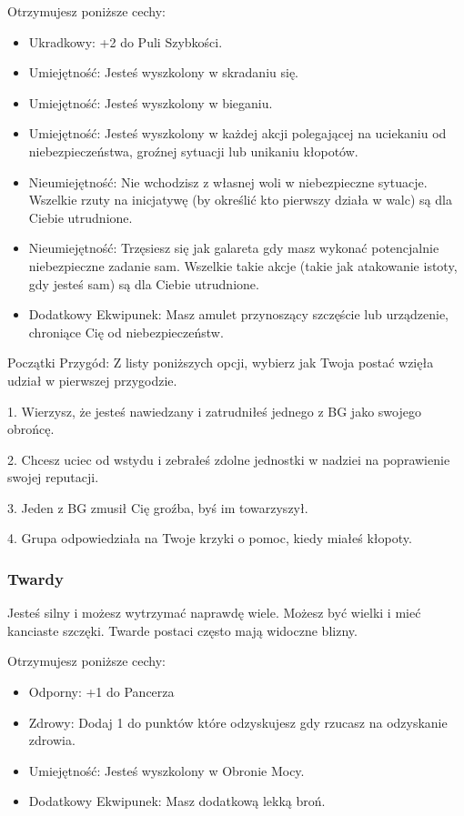 Otrzymujesz poniższe cechy:
\begin{itemize}
    \item  Ukradkowy: +2 do Puli Szybkości.
    \item  Umiejętność: Jesteś wyszkolony w skradaniu się.
    \item  Umiejętność: Jesteś wyszkolony w bieganiu.
    \item  Umiejętność: Jesteś wyszkolony w każdej akcji polegającej na uciekaniu od niebezpieczeństwa, groźnej sytuacji lub unikaniu kłopotów. 
    \item  Nieumiejętność: Nie wchodzisz z własnej woli w niebezpieczne sytuacje. Wszelkie rzuty na inicjatywę (by określić kto pierwszy działa w walc) są dla Ciebie utrudnione.
    \item  Nieumiejętność: Trzęsiesz się jak galareta gdy masz wykonać potencjalnie niebezpieczne zadanie sam. Wszelkie takie akcje (takie jak atakowanie istoty, gdy jesteś sam) są dla Ciebie utrudnione.
    \item  Dodatkowy Ekwipunek: Masz amulet przynoszący szczęście lub urządzenie, chroniące Cię od niebezpieczeństw. 
\end{itemize}

Początki Przygód: Z listy poniższych opcji, wybierz jak Twoja postać wzięła udział w pierwszej przygodzie.

1. Wierzysz, że jesteś nawiedzany i zatrudniłeś jednego z BG jako swojego obrońcę.

2. Chcesz uciec od wstydu i zebrałeś zdolne jednostki w nadziei na poprawienie swojej reputacji.

3. Jeden z BG zmusił Cię groźba, byś im towarzyszył.

4. Grupa odpowiedziała na Twoje krzyki o pomoc, kiedy miałeś kłopoty.

\subsubsection{Twardy}

Jesteś silny i możesz wytrzymać naprawdę wiele. Możesz być wielki i mieć kanciaste szczęki. Twarde postaci często mają widoczne blizny.

Otrzymujesz poniższe cechy:
\begin{itemize}
    \item  Odporny: +1 do Pancerza
    \item  Zdrowy: Dodaj 1 do punktów które odzyskujesz gdy rzucasz na odzyskanie zdrowia.
    \item  Umiejętność: Jesteś wyszkolony w Obronie Mocy.
    \item  Dodatkowy Ekwipunek: Masz dodatkową lekką broń.
\end{itemize}

